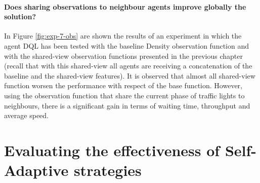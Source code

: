 \paragraph{Does sharing observations to neighbour agents improve globally the solution?}

In Figure \ref{fig:exp-7-obs} are shown the results of an experiment in which the agent DQL has been tested with the baseline Density observation function and with the shared-view observation functions presented in the previous chapter (recall that with this shared-view all agents are receiving a concatenation of the baseline and the shared-view features).
It is observed that almost all shared-view function worsen the performance with respect of the base function.
However, using the observation function that share the current phase of traffic lights to neighbours, there is a significant gain in terms of waiting time, throughput and average speed.

\newpage
{}


% 

\section{Evaluating the effectiveness of Self-Adaptive strategies}

